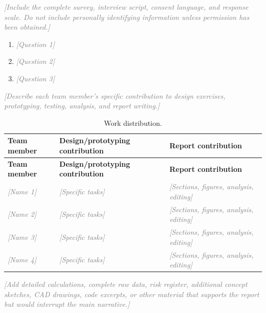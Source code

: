 \documentclass[11pt,letterpaper]{article}
\newcommand{\placeholder}[1]{\textcolor{gray}{\textit{[#1]}}}
\begin{document}
\placeholder{Include the complete survey, interview script, consent language,
and response scale. Do not include personally identifying information unless
permission has been obtained.}

\begin{enumerate}
    \item \placeholder{Question 1}
    \item \placeholder{Question 2}
    \item \placeholder{Question 3}
\end{enumerate}

\placeholder{Describe each team member's specific contribution to design
exercises, prototyping, testing, analysis, and report writing.}

\begin{longtable}{p{}p{}p{}}
\caption{Work distribution.}\label{tab:work-distribution}\\
\toprule
\textbf{Team member} & \textbf{Design/prototyping contribution} &
\textbf{Report contribution} \\
\midrule
\endfirsthead
\toprule
\textbf{Team member} & \textbf{Design/prototyping contribution} &
\textbf{Report contribution} \\
\midrule
\endhead
\placeholder{Name 1} & \placeholder{Specific tasks} & \placeholder{Sections,
figures, analysis, editing} \\
\placeholder{Name 2} & \placeholder{Specific tasks} & \placeholder{Sections,
figures, analysis, editing} \\
\placeholder{Name 3} & \placeholder{Specific tasks} & \placeholder{Sections,
figures, analysis, editing} \\
\placeholder{Name 4} & \placeholder{Specific tasks} & \placeholder{Sections,
figures, analysis, editing} \\
\bottomrule
\end{longtable}

\placeholder{Add detailed calculations, complete raw data, risk register,
additional concept sketches, CAD drawings, code excerpts, or other material
that supports the report but would interrupt the main narrative.}
\end{document}
